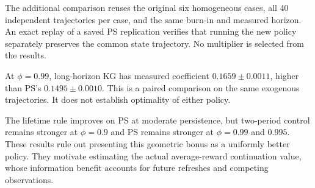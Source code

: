 The additional comparison reuses the original six homogeneous cases, all 40 independent trajectories per case, and the same burn-in and measured horizon. An exact replay of a saved PS replication verifies that running the new policy separately preserves the common state trajectory. No multiplier is selected from the results.
\begin{table}[ht]
\centering
\caption{Additional common-trajectory comparison. Smaller coefficients are better; positive paired PS minus KG differences favor KG. Intervals are approximate 95\% intervals.}
\end{table}

At $\phi=0.99$, long-horizon KG has measured coefficient $0.1659\pm0.0011$, higher than PS's $0.1495\pm0.0010$. This is a paired comparison on the same exogenous trajectories. It does not establish optimality of either policy.


The lifetime rule improves on PS at moderate persistence, but two-period control remains stronger at $\phi=0.9$ and PS remains stronger at $\phi=0.99$ and $0.995$. These results rule out presenting this geometric bonus as a uniformly better policy. They motivate estimating the actual average-reward continuation value, whose information benefit accounts for future refreshes and competing observations.


